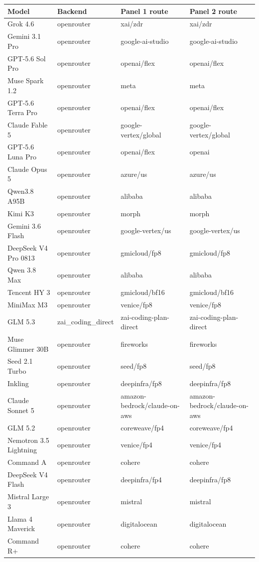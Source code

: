 \begin{tabular}{@{}l l l l@{}}
\toprule
Model & Backend & Panel 1 route & Panel 2 route \\
\midrule
Grok 4.6 & openrouter & xai/zdr & xai/zdr \\
Gemini 3.1 Pro & openrouter & google-ai-studio & google-ai-studio \\
GPT-5.6 Sol Pro & openrouter & openai/flex & openai/flex \\
Muse Spark 1.2 & openrouter & meta & meta \\
GPT-5.6 Terra Pro & openrouter & openai/flex & openai/flex \\
Claude Fable 5 & openrouter & google-vertex/global & google-vertex/global \\
GPT-5.6 Luna Pro & openrouter & openai/flex & openai \\
Claude Opus 5 & openrouter & azure/us & azure/us \\
Qwen3.8 A95B & openrouter & alibaba & alibaba \\
Kimi K3 & openrouter & morph & morph \\
Gemini 3.6 Flash & openrouter & google-vertex/us & google-vertex/us \\
DeepSeek V4 Pro 0813 & openrouter & gmicloud/fp8 & gmicloud/fp8 \\
Qwen 3.8 Max & openrouter & alibaba & alibaba \\
Tencent HY 3 & openrouter & gmicloud/bf16 & gmicloud/bf16 \\
MiniMax M3 & openrouter & venice/fp8 & venice/fp8 \\
GLM 5.3 & zai\_coding\_direct & zai-coding-plan-direct & zai-coding-plan-direct \\
Muse Glimmer 30B & openrouter & fireworks & fireworks \\
Seed 2.1 Turbo & openrouter & seed/fp8 & seed/fp8 \\
Inkling & openrouter & deepinfra/fp8 & deepinfra/fp8 \\
Claude Sonnet 5 & openrouter & amazon-bedrock/claude-on-aws & amazon-bedrock/claude-on-aws \\
GLM 5.2 & openrouter & coreweave/fp4 & coreweave/fp4 \\
Nemotron 3.5 Lightning & openrouter & venice/fp4 & venice/fp4 \\
Command A & openrouter & cohere & cohere \\
DeepSeek V4 Flash & openrouter & deepinfra/fp4 & deepinfra/fp8 \\
Mistral Large 3 & openrouter & mistral & mistral \\
Llama 4 Maverick & openrouter & digitalocean & digitalocean \\
Command R+ & openrouter & cohere & cohere \\
\bottomrule
\end{tabular}
